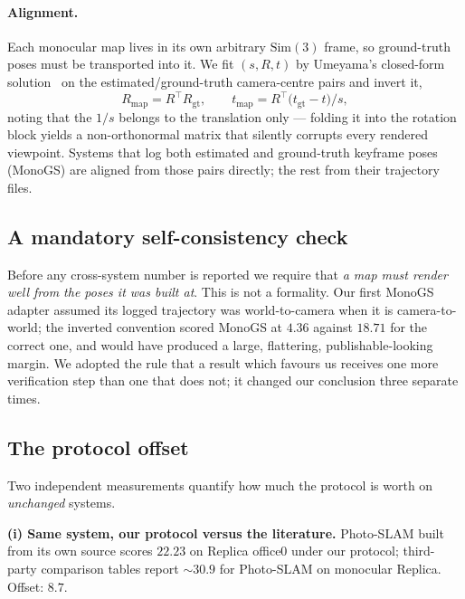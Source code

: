 \paragraph{Alignment.}
Each monocular map lives in its own arbitrary $\mathrm{Sim}(3)$ frame, so
ground-truth poses must be transported into it. We fit
$(s,R,t)$ by Umeyama's closed-form solution~\cite{umeyama1991} on the
estimated/ground-truth camera-centre pairs and invert it,
\begin{equation}
R_{\text{map}} = R^{\top} R_{\text{gt}},\qquad
t_{\text{map}} = R^{\top}\bigl(t_{\text{gt}}-t\bigr)/s ,
\label{eq:align}
\end{equation}
noting that the $1/s$ belongs to the translation only --- folding it into the
rotation block yields a non-orthonormal matrix that silently corrupts every
rendered viewpoint. Systems that log both estimated and ground-truth keyframe
poses (MonoGS) are aligned from those pairs directly; the rest from their
trajectory files.

\subsection{A mandatory self-consistency check}
\label{sec:protocol:selfcheck}
Before any cross-system number is reported we require that \emph{a map must
render well from the poses it was built at}. This is not a formality. Our first
MonoGS adapter assumed its logged trajectory was world-to-camera when it is
camera-to-world; the inverted convention scored MonoGS at $4.36$\dB{} against
$18.71$\dB{} for the correct one, and would have produced a large, flattering,
publishable-looking margin. We adopted the rule that a result which favours us
receives one more verification step than one that does not; it changed our
conclusion three separate times.

\subsection{The protocol offset}
\label{sec:protocol:offset}

Two independent measurements quantify how much the protocol is worth on
\emph{unchanged} systems.

\noindent\textbf{(i) Same system, our protocol versus the literature.}
Photo-SLAM built from its own source scores $22.23$\dB{} on Replica office0
under our protocol; third-party comparison tables report ${\sim}30.9$\dB{} for
Photo-SLAM on monocular Replica. Offset: $\mathbf{8.7}$\dB{}.


